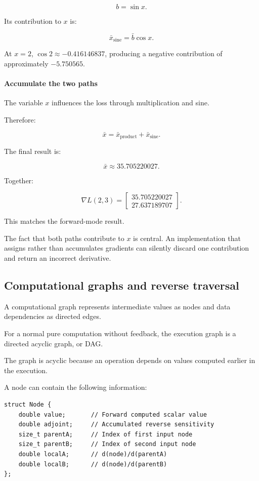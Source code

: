 \[
b=\sin x.
\]

Its contribution to \(x\) is:

\[
\bar x_{\text{sine}} = \bar b\cos x.
\]

At \(x=2\), \(\cos2\approx-0.416146837\), producing a negative contribution of approximately \(-5.750565\).

\paragraph{Accumulate the two paths}\label{02-foundations-ii-ch022-accumulate-the-two-paths}

The variable \(x\) influences the loss through multiplication and sine.

Therefore:

\[
\bar x = \bar x_{\text{product}} + \bar x_{\text{sine}}.
\]

The final result is:

\[
\boxed{\bar x\approx35.705220027}.
\]

Together:

\[
\boxed{ \nabla L(2,3)= \begin{bmatrix} 35.705220027\\ 27.637189707 \end{bmatrix} }.
\]

This matches the forward-mode result.

The fact that both paths contribute to \(x\) is central. An implementation that assigns rather than accumulates gradients can silently discard one contribution and return an incorrect derivative.

\subsection{Computational graphs and reverse traversal}\label{02-foundations-ii-ch022-computational-graphs-and-reverse-traversal}

A computational graph represents intermediate values as nodes and data dependencies as directed edges.

For a normal pure computation without feedback, the execution graph is a directed acyclic graph, or DAG.

The graph is acyclic because an operation depends on values computed earlier in the execution.

A node can contain the following information:

\begin{verbatim}
struct Node {
    double value;       // Forward computed scalar value
    double adjoint;     // Accumulated reverse sensitivity
    size_t parentA;     // Index of first input node
    size_t parentB;     // Index of second input node
    double localA;      // d(node)/d(parentA)
    double localB;      // d(node)/d(parentB)
};
\end{verbatim}


